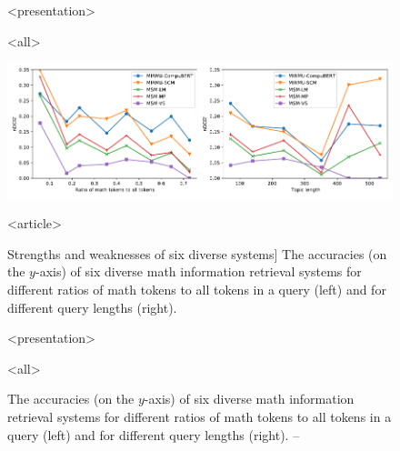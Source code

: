 \begin{figure}

\mode
<presentation>

\vspace*{-0.2cm}

\mode
<all>

\vspace*{-0.25cm}

\hspace*{-0.025\columnwidth}
\includegraphics[width=1.025\columnwidth, trim={0 3.9mm 0 0}, clip]{strengths-and-weaknesses}

\mode
<article>

\caption
  [Strengths and weaknesses of six diverse systems]%
  {The accuracies (on the $y$-axis) of six diverse math information retrieval 
   systems for different ratios of math tokens to all tokens in a query (left)
   and for different query lengths (right). \cite[Figure 8]{novotny2021ensembling}}

\mode
<presentation>

\vspace*{-0.2cm}

\caption
  {The accuracies (on the $y$-axis) of six diverse math information retrieval 
   systems for different ratios of math tokens to all tokens in a query (left)
   and for different query lengths (right). -- \textcite[Figure 8]{novotny2021ensembling}}

\mode
<all>

\label{fig:strengths-and-weaknesses}
\end{figure}
